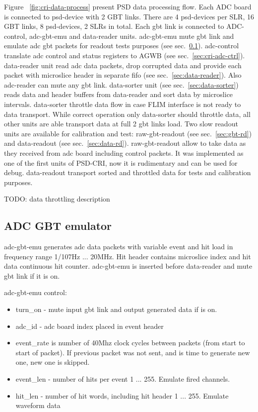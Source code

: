 \documentclass{article}
\begin{document}
Figure ~\ref{fig:cri-data-process} present PSD data processing flow. Each ADC board is connected to psd-device with 2 GBT links. There are 4 psd-devices per SLR, 16 GBT links, 8 psd-devices, 2 SLRs in total. Each gbt link is connected to ADC-control, adc-gbt-emu and data-reader units. adc-gbt-emu mute gbt link and emulate adc gbt packets for readout tests purposes (see sec.~\ref{sec:gbt-emu}). adc-control translate adc control and status registers to AGWB (see sec.~\ref{sec:cri-adc-ctrl}). data-reader unit read adc data packets, drop corrupted data and provide each packet with microslice header in separate fifo (see sec.~\ref{sec:data-reader}). Also adc-reader can mute any gbt link. data-sorter unit (see sec.~\ref{sec:data-sorter}) reads data and header buffers from data-reader and sort data by microslice intervals. data-sorter throttle data flow in case FLIM interface is not ready to data transport. While correct operation only data-sorter should throttle data, all other units are able transport data at full 2 gbt links load. Two slow readout units are available for calibration and test: raw-gbt-readout (see sec.~\ref{sec:gbt-rd}) and data-readout (see sec.~\ref{sec:data-rd}). raw-gbt-readout allow to take data as they received from adc board including control packets. It was implemented as one of the first units of PSD-CRI, now it is rudimentary and can be used for debug. data-readout transport sorted and throttled data for tests and calibration purposes.

TODO: data throttling description



\subsection{ADC GBT emulator}\label{sec:gbt-emu}
adc-gbt-emu generates adc data packets with variable event and hit load in frequency range 1/107Hz ... 20MHz.
Hit header contains microslice index and hit data continuous hit counter. adc-gbt-emu is inserted before data-reader and mute gbt link if it is on.

adc-gbt-emu control:
\begin{itemize}
\item turn\_on - mute input gbt link and output generated data if is on.
\item adc\_id - adc board index placed in event header
\item event\_rate is number of 40Mhz clock cycles between packets (from start to start of packet). If previous packet was not sent, and is time to generate new one, new one is skipped.
\item event\_len - number of hits per event 1 ... 255. Emulate fired channels.
\item hit\_len - number of hit words, including hit header 1 ... 255. Emulate waveform data
\end{itemize}
\end{document}
